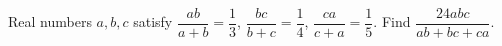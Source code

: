 Real numbers $a,b,c$ satisfy $\dfrac{ab}{a+b}=\dfrac13$, $\dfrac{bc}{b+c}=\dfrac14$, $\dfrac{ca}{c+a}=\dfrac15$. Find $\dfrac{24abc}{ab+bc+ca}$.
